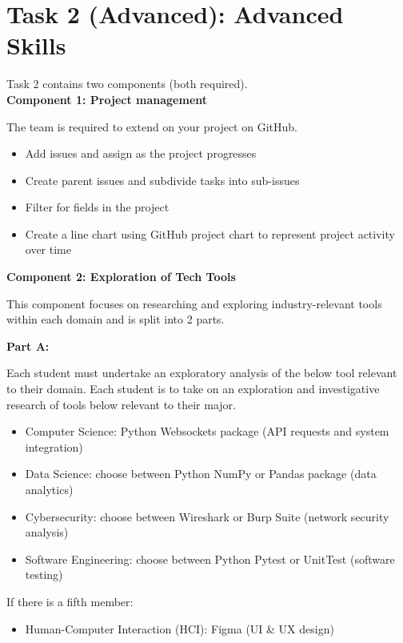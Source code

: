 \documentclass[a4paper, 11pt]{report}
\begin{document}

\newpage
\section{Task 2 (Advanced): Advanced Skills}

Task 2 contains two components (both required).\\[2mm]

\textbf{Component 1: Project management}

The team is required to extend on your project on GitHub.

\begin{itemize}
    \item Add issues and assign as the project progresses
    \item Create parent issues and subdivide tasks into sub-issues
    \item Filter for fields in the project
    \item Create a line chart using GitHub project chart to represent project activity over time
\end{itemize} 

\vspace{4ex}

\textbf{Component 2: Exploration of Tech Tools}

This component focuses on researching and exploring industry-relevant tools within each domain and is split into 2 parts.

\vspace{2ex}


\textbf{Part A:}

Each student must undertake an exploratory analysis of the below tool relevant to their domain. 
Each student is to take on an exploration and investigative research of tools below relevant to their major. 

\begin{itemize}
    \item Computer Science: Python Websockets package (API requests and system integration)
    \item Data Science: choose between Python NumPy or Pandas package (data analytics)
    \item Cybersecurity: choose between Wireshark or Burp Suite (network security analysis)
    \item Software Engineering: choose between Python Pytest or UnitTest (software testing)
\end{itemize}
If there is a fifth member:
\begin{itemize}
    \item Human-Computer Interaction (HCI): Figma (UI \& UX design)
\end{itemize}
\end{document}
